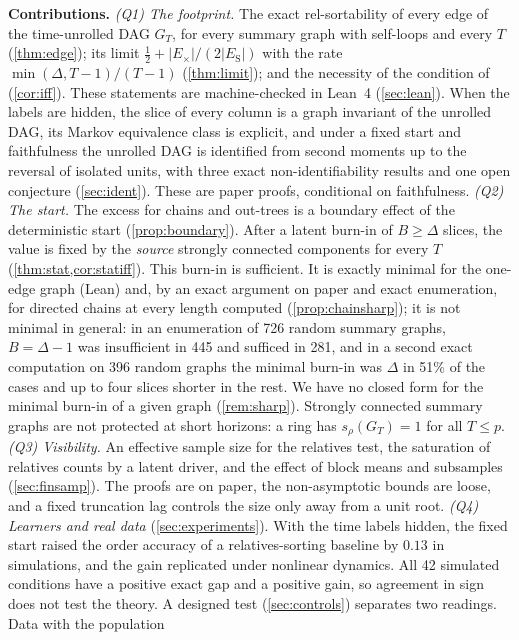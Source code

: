 \documentclass[pdflatex,sn-apa]{sn-jnl}
\theoremstyle{thmstyleone}
\theoremstyle{thmstylethree}
\theoremstyle{thmstyletwo}
\newcommand{\Es}{E_{\mathrm S}}
\newcommand{\Ex}{E_{\times}}
\newcommand{\GT}{G_T}
\newcommand{\srho}{s_\rho}
\begin{document}
\textbf{Contributions.} \emph{(Q1) The footprint.} The exact rel-sortability of
every edge of the time-unrolled DAG $\GT$, for every summary graph with
self-loops and every $T$ (\cref{thm:edge}); its limit
$\tfrac12+|\Ex|/(2|\Es|)$ with the rate $\min(\Delta,T{-}1)/(T{-}1)$
(\cref{thm:limit}); and the necessity of the condition of
\citet[Thm.~4]{reisach2026topological} (\cref{cor:iff}). These statements are
machine-checked in Lean~4 (\cref{sec:lean}). When the labels are hidden, the
slice of every column is a graph invariant of the unrolled DAG, its Markov
equivalence class is explicit, and under a fixed start and faithfulness the
unrolled DAG is identified from second moments up to the reversal of isolated
units, with three exact non-identifiability results and one open conjecture
(\cref{sec:ident}). These are paper proofs, conditional on faithfulness.
\emph{(Q2) The start.} The excess for chains and out-trees is a boundary
effect of the deterministic start (\cref{prop:boundary}). After a latent
burn-in of $B\ge\Delta$ slices, the value is fixed by the \emph{source}
strongly connected components for every $T$ (\cref{thm:stat,cor:statiff}).
This burn-in is sufficient. It is exactly minimal for the one-edge graph
(Lean) and, by an exact argument on paper and exact enumeration, for directed
chains at every length computed (\cref{prop:chainsharp}); it is not minimal in
general: in an enumeration of 726 random summary graphs, $B=\Delta-1$ was
insufficient in 445 and sufficed in 281, and in a second exact computation on
396 random graphs the minimal burn-in was $\Delta$ in 51\% of the cases and up
to four slices shorter in the rest. We have no closed form for the minimal
burn-in of a given graph (\cref{rem:sharp}). Strongly connected
summary graphs are not protected at short horizons: a ring has $\srho(\GT)=1$
for all $T\le p$.
\emph{(Q3) Visibility.} An effective sample size for the relatives test, the
saturation of relatives counts by a latent driver, and the effect of block
means and subsamples (\cref{sec:finsamp}). The proofs are on paper, the
non-asymptotic bounds are loose, and a fixed truncation lag controls the size
only away from a unit root.
\emph{(Q4) Learners and real data} (\cref{sec:experiments}). With the time
labels hidden, the fixed start raised the order accuracy of a relatives-sorting
baseline by $0.13$ in simulations, and the gain replicated under nonlinear
dynamics. All 42 simulated conditions have a positive exact gap and a positive
gain, so agreement in sign does not test the theory. A designed test
(\cref{sec:controls}) separates two readings. Data with the population
\end{document}
